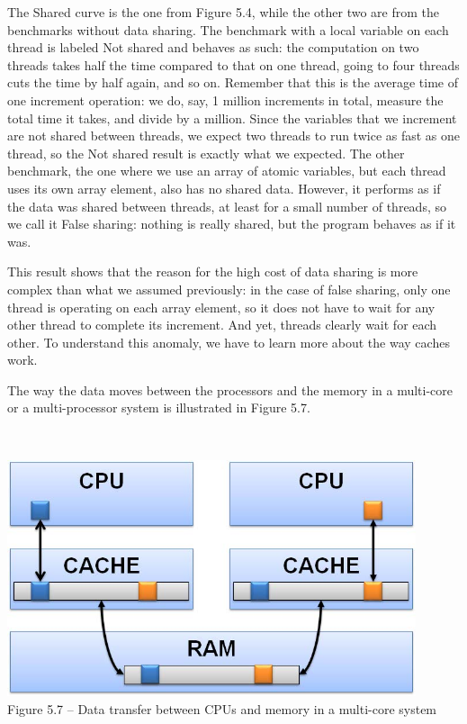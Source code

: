 The Shared curve is the one from Figure 5.4, while the other two are from the benchmarks without data sharing. The benchmark with a local variable on each thread is labeled Not shared and behaves as such: the computation on two threads takes half the time compared to that on one thread, going to four threads cuts the time by half again, and so on. Remember that this is the average time of one increment operation: we do, say, 1 million increments in total, measure the total time it takes, and divide by a million. Since the variables that we increment are not shared between threads, we expect two threads to run twice as fast as one thread, so the Not shared result is exactly what we expected. The other benchmark, the one where we use an array of atomic variables, but each thread uses its own array element, also has no shared data. However, it performs as if the data was shared between threads, at least for a small number of threads, so we call it False sharing: nothing is really shared, but the program behaves as if it was.

This result shows that the reason for the high cost of data sharing is more complex than what we assumed previously: in the case of false sharing, only one thread is operating on each array element, so it does not have to wait for any other thread to complete its increment. And yet, threads clearly wait for each other. To understand this anomaly, we have to learn more about the way caches work.

The way the data moves between the processors and the memory in a multi-core or a multi-processor system is illustrated in Figure 5.7.

\hspace*{\fill} \\ %
\begin{center}
\includegraphics[width=0.9\textwidth]{content/1/chapter5/images/7.jpg}\\
Figure 5.7 – Data transfer between CPUs and memory in a multi-core system
\end{center}

